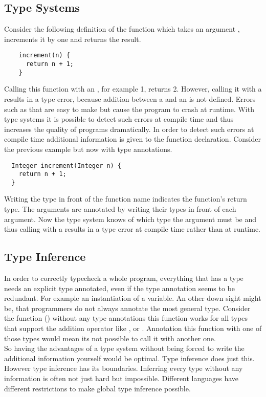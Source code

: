 \subsection{Type Systems}
Consider the following definition of the function  which takes an argument ,
increments it by one and returns the result.
\begin{verbatim}
    increment(n) {
      return n + 1;
    }
\end{verbatim}
Calling this function with an , for example 1, returns 2.
However, calling it with a  results in a type error, because addition between a 
and an  is not defined.
Errors such as that are easy to make but cause the program to crash at runtime.
With type systems it is possible to detect such errors at compile time and thus increases the quality of programs dramatically.
In order to detect such errors at compile time additional information is given to the function declaration.
Consider the previous example but now with type annotations.
\begin{verbatim}
  Integer increment(Integer n) {
    return n + 1;
  }
\end{verbatim}
Writing the type  in front of the function name indicates the function's return type.
The arguments are annotated by writing their types in front of each argument.
Now the type system knows of which type the argument must be and thus calling  with a  results in a type error at compile time rather than at runtime.

\subsection{Type Inference}
In order to correctly typecheck a whole program, everything that has a type needs an explicit type annotated,
even if the type annotation seems to be redundant. For example an instantiation of a variable.
An other down sight might be, that programmers do not always annotate the most general type. Consider the function  (\inl{+}) without any type annotations this function works for all types that support the addition operator like ,  or .
Annotation this  function with one of those types would mean its not possible to call it with another one.\\
So having the advantages of a type system without being forced to write the additional information yourself would be optimal. Type inference does just this.
However type inference has its boundaries. Inferring every type without any information is often not just hard but impossible. Different languages have different restrictions to make global type inference possible.

